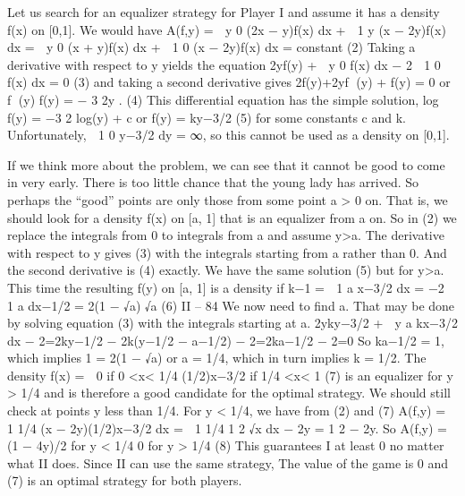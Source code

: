 \documentclass[]{report}
\begin{document}
Let us search for an equalizer strategy for Player I and assume it has a density f(x)
on [0,1]. We would have
A(f,y) =  y
0
(2x − y)f(x) dx +
 1
y
(x − 2y)f(x) dx
=
 y
0
(x + y)f(x) dx +
 1
0
(x − 2y)f(x) dx = constant
(2)
Taking a derivative with respect to y yields the equation
2yf(y) +  y
0
f(x) dx − 2
 1
0
f(x) dx = 0 (3)
and taking a second derivative gives
2f(y)+2yf
(y) + f(y) = 0 or f
(y)
f(y) = − 3
2y
. (4)
This differential equation has the simple solution,
log f(y) = −3
2 log(y) + c or f(y) = ky−3/2 (5)
for some constants c and k. Unfortunately,  1
0 y−3/2 dy = ∞, so this cannot be used as a
density on [0,1].

If we think more about the problem, we can see that it cannot be good to come in very
early. There is too little chance that the young lady has arrived. So perhaps the “good”
points are only those from some point a > 0 on. That is, we should look for a density
f(x) on [a, 1] that is an equalizer from a on. So in (2) we replace the integrals from 0 to
integrals from a and assume y>a. The derivative with respect to y gives (3) with the
integrals starting from a rather than 0. And the second derivative is (4) exactly. We have
the same solution (5) but for y>a. This time the resulting f(y) on [a, 1] is a density if
k−1 =
 1
a
x−3/2 dx = −2
 1
a
dx−1/2 = 2(1 − √a)
√a (6)
II – 84
We now need to find a. That may be done by solving equation (3) with the integrals
starting at a.
2yky−3/2 +
 y
a
kx−3/2 dx − 2=2ky−1/2 − 2k(y−1/2 − a−1/2) − 2=2ka−1/2 − 2=0
So ka−1/2 = 1, which implies 1 = 2(1 − √a) or a = 1/4, which in turn implies k = 1/2.
The density
f(x) =  0 if 0 <x< 1/4
(1/2)x−3/2 if 1/4 <x< 1 (7)
is an equalizer for y > 1/4 and is therefore a good candidate for the optimal strategy. We
should still check at points y less than 1/4. For y < 1/4, we have from (2) and (7)
A(f,y) =  1
1/4
(x − 2y)(1/2)x−3/2 dx =
 1
1/4
1
2
√x
dx − 2y = 1
2 − 2y.
So
A(f,y) =  (1 − 4y)/2 for y < 1/4
0 for y > 1/4 (8)
This guarantees I at least 0 no matter what II does. Since II can use the same strategy,
The value of the game is 0 and (7) is an optimal strategy for both players.

\end{document}
